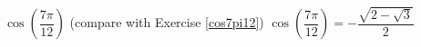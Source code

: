 {$\cos\left( \dfrac{7\pi}{12} \right)$  (compare with Exercise \ref{cos7pi12})}
{$\cos\left( \dfrac{7\pi}{12} \right) = -\dfrac{\sqrt{2-\sqrt{3}}}{2}$  }
